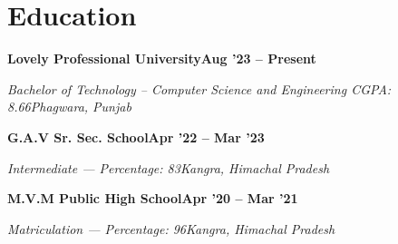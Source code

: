 \documentclass[letterpaper, 11pt]{article}
\newcommand{\eduentry}[4]{%
  \noindent\textbf{#1}\hfill\textbf{#2}\par
  \noindent\textit{#3}\hfill\textit{#4}\par
  \vspace{3pt}%
}
\begin{document}
\section{Education}

\eduentry{Lovely Professional University}{Aug '23 -- Present}
  {Bachelor of Technology -- Computer Science and Engineering \quad CGPA: 8.66}{Phagwara, Punjab}

\eduentry{G.A.V Sr. Sec. School}{Apr '22 -- Mar '23}
  {Intermediate --- Percentage: 83}{Kangra, Himachal Pradesh}

\eduentry{M.V.M Public High School}{Apr '20 -- Mar '21}
  {Matriculation --- Percentage: 96}{Kangra, Himachal Pradesh}
\end{document}
